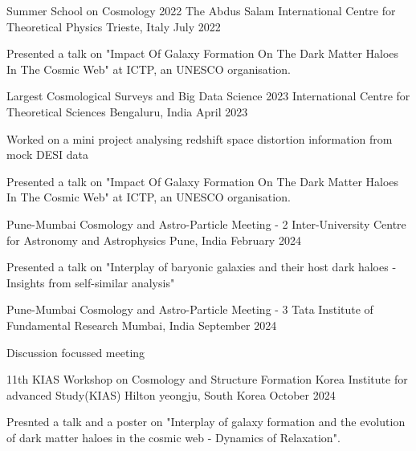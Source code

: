 \begin{cventries}

{
\cventry
{Summer School on Cosmology 2022}
{The Abdus Salam International Centre for Theoretical Physics}
{Trieste, Italy}
{July 2022}
{
\begin{cvitems}
\item {Presented a talk on "Impact Of Galaxy Formation On The Dark Matter Haloes In The Cosmic Web" at ICTP, an UNESCO organisation.}
\end{cvitems}
}
}

{
\cventry
{Largest Cosmological Surveys and Big Data Science 2023}
{International Centre for Theoretical Sciences}
{Bengaluru, India}
{April 2023}
{
\begin{cvitems}
\item {Worked on a mini project analysing redshift space distortion information from mock DESI data}
\item {Presented a talk on "Impact Of Galaxy Formation On The Dark Matter Haloes In The Cosmic Web" at ICTP, an UNESCO organisation.}
\end{cvitems}
}
}


{
\cventry
{Pune-Mumbai Cosmology and Astro-Particle Meeting - 2}
{Inter-University Centre for Astronomy and Astrophysics}
{Pune, India}
{February 2024}
{
\begin{cvitems}
\item {Presented a talk on "Interplay of baryonic galaxies and their host dark haloes - Insights from self-similar analysis"}
\end{cvitems}
}
}

{
\cventry
{Pune-Mumbai Cosmology and Astro-Particle Meeting - 3}
{Tata Institute of Fundamental Research}
{Mumbai, India}
{September 2024}
{
\begin{cvitems}
\item {Discussion focussed meeting}
\end{cvitems}
}
}

{
\cventry
{11th KIAS Workshop on Cosmology and Structure Formation}
{Korea Institute for advanced Study(KIAS)}
{Hilton yeongju, South Korea}
{October 2024}
{
\begin{cvitems}
\item {Presnted a talk and a poster on "Interplay of galaxy formation and the evolution of dark matter haloes in the cosmic web - Dynamics of Relaxation".}
\end{cvitems}
}
}





\end{cventries}
